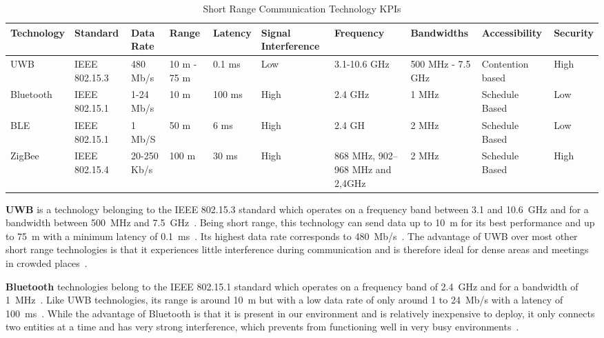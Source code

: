 \begin{table}[ht!]
  \centering
  \caption{Short Range Communication Technology \acrshort{KPI}s}
  \label{tab:short-range-com}
  \begin{tabular}{p{} p{1cm} p{1cm} p{1cm} p{1cm} p{1.5cm} p{1.2cm} p{1.3cm} p{1.4cm} p{1.4cm}}
    \hline
    Technology & Standard & Data Rate & Range & Latency & Signal Interference  & Frequency & Bandwidths & Accessibility & Security\\
    \hline
    UWB &  IEEE 802.15.3  & 480 Mb/s	&   10 m - 75 m	 &  0.1 ms  & Low & 3.1-10.6 GHz	 &500 MHz - 7.5 GHz	 & Contention based	& High\\
   
    Bluetooth  & IEEE 802.15.1	& 1-24 Mb/s	&  10 m&	100 ms  & High &  2.4 GHz	& 1 MHz& 	Schedule Based	& Low\\
	
    BLE  & IEEE 802.15.1	& 1 Mb/S	&  50 m& 6 ms & High&	2.4 GH &	2 MHz 	&Schedule Based&	Low\\

    ZigBee& IEEE 802.15.4	&20-250 Kb/s&	 100 m	&30 ms  &High	&868 MHz, 902–968 MHz and 2,4GHz	&2 MHz & Schedule Based	&High\\
    \hline
  \end{tabular}
\end{table}

\textbf{\acrfull{UWB}} is a technology belonging to the IEEE 802.15.3 standard which operates on a frequency band between 3.1 and 10.6~GHz and for a bandwidth between 500~MHz and 7.5~GHz~\cite{anwer_survey_2014,ahangar_survey_2021}. Being short range, this technology can send data up to 10~m for its best performance and up to 75~m with a minimum latency of 0.1~ms~\cite{ahangar_survey_2021}. Its highest data rate corresponds to 480~Mb/s~\cite{wang_networking_2019}. The advantage of UWB over most other short range technologies is that it experiences little interference during communication and is therefore ideal for dense areas and meetings in crowded places~\cite{ahangar_survey_2021}. 

\textbf{Bluetooth} technologies belong to the IEEE 802.15.1 standard which operates on a frequency band of 2.4~GHz and for a bandwidth of 1~MHz~\cite{anwer_survey_2014,ahangar_survey_2021}. Like UWB technologies, its range is around 10~m but with a low data rate of only around 1 to 24~Mb/s with a latency of 100~ms~\cite{ahangar_survey_2021}. While the advantage of Bluetooth is that it is present in our environment and is relatively inexpensive to deploy, it only connects two entities at a time and has very strong interference, which prevents from functioning well in very busy environments~\cite{wang_networking_2019,bluetooth_bluetooth_2021,akpakwu_survey_2018}. 


